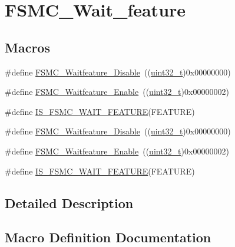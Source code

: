 \hypertarget{group___f_s_m_c___wait__feature}{}\section{F\+S\+M\+C\+\_\+\+Wait\+\_\+feature}
\label{group___f_s_m_c___wait__feature}
\subsection*{Macros}
\begin{DoxyCompactItemize}
\item 
\#define \hyperlink{group___f_s_m_c___wait__feature_ga8a31f05576e66546fbbcdb06ff67da7d}{F\+S\+M\+C\+\_\+\+Waitfeature\+\_\+\+Disable}~((\hyperlink{_p_e___types_8h_a33594304e786b158f3fb30289278f5af}{uint32\+\_\+t})0x00000000)
\item 
\#define \hyperlink{group___f_s_m_c___wait__feature_ga3113366130dfbf6d116f1afb94af1726}{F\+S\+M\+C\+\_\+\+Waitfeature\+\_\+\+Enable}~((\hyperlink{_p_e___types_8h_a33594304e786b158f3fb30289278f5af}{uint32\+\_\+t})0x00000002)
\item 
\#define \hyperlink{group___f_s_m_c___wait__feature_ga07c2585b517df2c7afbe3ba16c22f236}{I\+S\+\_\+\+F\+S\+M\+C\+\_\+\+W\+A\+I\+T\+\_\+\+F\+E\+A\+T\+U\+RE}(F\+E\+A\+T\+U\+RE)
\item 
\#define \hyperlink{group___f_s_m_c___wait__feature_ga8a31f05576e66546fbbcdb06ff67da7d}{F\+S\+M\+C\+\_\+\+Waitfeature\+\_\+\+Disable}~((\hyperlink{_p_e___types_8h_a33594304e786b158f3fb30289278f5af}{uint32\+\_\+t})0x00000000)
\item 
\#define \hyperlink{group___f_s_m_c___wait__feature_ga3113366130dfbf6d116f1afb94af1726}{F\+S\+M\+C\+\_\+\+Waitfeature\+\_\+\+Enable}~((\hyperlink{_p_e___types_8h_a33594304e786b158f3fb30289278f5af}{uint32\+\_\+t})0x00000002)
\item 
\#define \hyperlink{group___f_s_m_c___wait__feature_ga07c2585b517df2c7afbe3ba16c22f236}{I\+S\+\_\+\+F\+S\+M\+C\+\_\+\+W\+A\+I\+T\+\_\+\+F\+E\+A\+T\+U\+RE}(F\+E\+A\+T\+U\+RE)
\end{DoxyCompactItemize}


\subsection{Detailed Description}


\subsection{Macro Definition Documentation}
